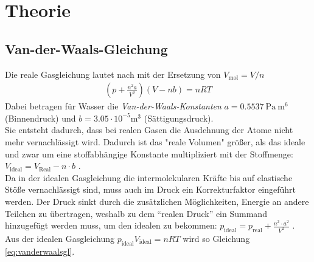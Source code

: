 \documentclass[12pt,a4paper,titlepage,headinclude,bibtotoc]{scrartcl}
\begin{document}
\section{Theorie}
\label{sec:theorie}

\subsection{Van-der-Waals-Gleichung}
Die reale Gasgleichung lautet nach \cite[S. 303]{gerthsen} mit der Ersetzung von $V_\text{mol}=V/n$ 
\begin{align}
	\left(p+\frac{n^2a}{V^2}\right)\left( V-nb \right)=nRT \label{eq:vanderwaalsgl}
\end{align}
Dabei betragen für Wasser die \emph{Van-der-Waals-Konstanten} $a=0.5537~\si{\pascal~\meter^6}$ (Binnendruck) und $b=3.05\cdot10^{-5}\si{\meter^3}$ (Sättigungsdruck).\\
Sie entsteht dadurch, dass bei realen Gasen die Ausdehnung der Atome nicht mehr vernachlässigt wird.
Dadurch ist das "reale Volumen" größer, als das ideale und zwar um eine stoffabhängige Konstante multipliziert mit der Stoffmenge: $V_\text{ideal}=V_\text{Real}-n\cdot b$ .\\
Da in der idealen Gasgleichung die intermolekularen Kräfte bis auf elastische Stöße vernachlässigt sind, muss auch im Druck ein Korrekturfaktor eingeführt werden.
Der Druck sinkt durch die zusätzlichen Möglichkeiten, Energie an andere Teilchen zu übertragen, weshalb zu dem ``realen Druck'' ein Summand hinzugefügt werden muss, um den idealen zu bekommen: $p_\text{ideal}=p_\text{real}+\frac{n^2\cdot a^2}{V^2}$ .
Aus der idealen Gasgleichung $p_\text{ideal}V_\text{ideal}=nRT$ wird so Gleichung \eqref{eq:vanderwaalsgl}.
\end{document}
